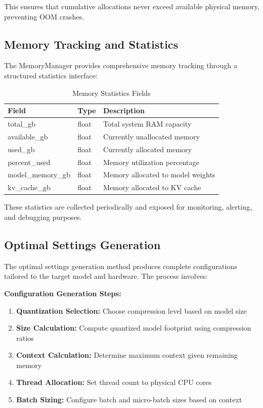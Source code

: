 This ensures that cumulative allocations never exceed available physical memory, preventing OOM crashes.

\subsection{Memory Tracking and Statistics}

The MemoryManager provides comprehensive memory tracking through a structured statistics interface:

\begin{table}[h]
\centering
\caption{Memory Statistics Fields}
\label{tab:memory_stats_fields}
\begin{tabular}{lll}
\toprule
\textbf{Field} & \textbf{Type} & \textbf{Description} \\
\midrule
total\_gb & float & Total system RAM capacity \\
available\_gb & float & Currently unallocated memory \\
used\_gb & float & Currently allocated memory \\
percent\_used & float & Memory utilization percentage \\
model\_memory\_gb & float & Memory allocated to model weights \\
kv\_cache\_gb & float & Memory allocated to KV cache \\
\bottomrule
\end{tabular}
\end{table}

These statistics are collected periodically and exposed for monitoring, alerting, and debugging purposes.

\subsection{Optimal Settings Generation}

The optimal settings generation method produces complete configurations tailored to the target model and hardware. The process involves:

\textbf{Configuration Generation Steps:}
\begin{enumerate}
    \item \textbf{Quantization Selection:} Choose compression level based on model size
    \item \textbf{Size Calculation:} Compute quantized model footprint using compression ratios
    \item \textbf{Context Calculation:} Determine maximum context given remaining memory
    \item \textbf{Thread Allocation:} Set thread count to physical CPU cores
    \item \textbf{Batch Sizing:} Configure batch and micro-batch sizes based on context
\end{enumerate}


